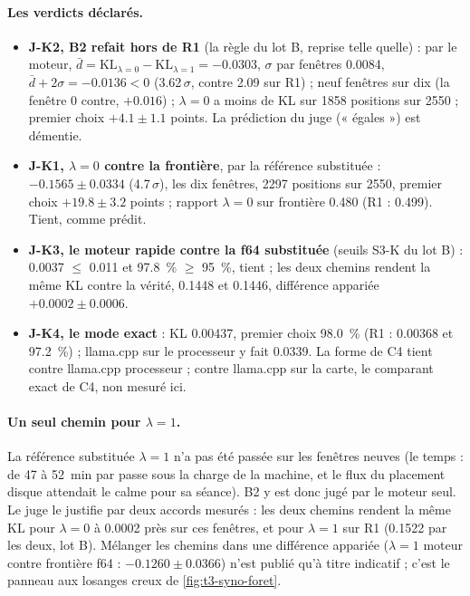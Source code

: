 \paragraph{Les verdicts déclarés.}
\begin{itemize}
\item \textbf{J-K2, B2 refait hors de R1} (la règle du lot B, reprise telle quelle) : par le moteur, $\bar d = \mathrm{KL}_{\lambda=0} - \mathrm{KL}_{\lambda=1} = -\num{0.0303}$, $\sigma$ par fenêtres \num{0.0084}, $\bar d + 2\sigma = -\num{0.0136} < 0$ (\num{3.62}\,$\sigma$, contre \num{2.09} sur R1) ; neuf fenêtres sur dix (la fenêtre 0 contre, $+\num{0.016}$) ; $\lambda = 0$ a moins de KL sur \num{1858} positions sur \num{2550} ; premier choix $+\num{4.1} \pm \num{1.1}$ points. La prédiction du juge (« égales ») est démentie.
\item \textbf{J-K1, $\lambda = 0$ contre la frontière}, par la référence substituée : $-\num{0.1565} \pm \num{0.0334}$ (\num{4.7}\,$\sigma$), les dix fenêtres, \num{2297} positions sur \num{2550}, premier choix $+\num{19.8} \pm \num{3.2}$ points ; rapport $\lambda = 0$ sur frontière \num{0.480} (R1 : \num{0.499}). Tient, comme prédit.
\item \textbf{J-K3, le moteur rapide contre la f64 substituée} (seuils S3-K du lot B) : \num{0.0037} $\le$ \num{0.011} et \SI{97.8}{\percent} $\ge$ \SI{95}{\percent}, tient ; les deux chemins rendent la même KL contre la vérité, \num{0.1448} et \num{0.1446}, différence appariée $+\num{0.0002} \pm \num{0.0006}$.
\item \textbf{J-K4, le mode exact} : KL \num{0.00437}, premier choix \SI{98.0}{\percent} (R1 : \num{0.00368} et \SI{97.2}{\percent}) ; llama.cpp sur le processeur y fait \num{0.0339}. La forme de C4 tient contre llama.cpp processeur ; contre llama.cpp sur la carte, le comparant exact de C4, non mesuré ici.
\end{itemize}

\paragraph{Un seul chemin pour $\lambda = 1$.} La référence substituée $\lambda = 1$ n'a pas été passée sur les fenêtres neuves (le temps : de 47 à \SI{52}{\minute} par passe sous la charge de la machine, et le flux du placement disque attendait le calme pour sa séance). B2 y est donc jugé par le moteur seul. Le juge le justifie par deux accords mesurés : les deux chemins rendent la même KL pour $\lambda = 0$ à \num{0.0002} près sur ces fenêtres, et pour $\lambda = 1$ sur R1 (\num{0.1522} par les deux, lot B). Mélanger les chemins dans une différence appariée ($\lambda = 1$ moteur contre frontière f64 : $-\num{0.1260} \pm \num{0.0366}$) n'est publié qu'à titre indicatif ; c'est le panneau aux losanges creux de \cref{fig:t3-syno-foret}.

